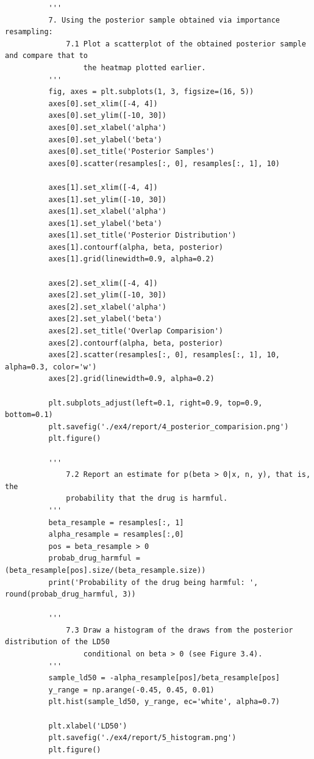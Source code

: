 \documentclass[11pt,a4paper,english]{article}
\begin{document}
\begin{appendices}
\begin{verbatim}
          '''
          7. Using the posterior sample obtained via importance resampling:
              7.1 Plot a scatterplot of the obtained posterior sample and compare that to
                  the heatmap plotted earlier.
          '''
          fig, axes = plt.subplots(1, 3, figsize=(16, 5))
          axes[0].set_xlim([-4, 4])
          axes[0].set_ylim([-10, 30])
          axes[0].set_xlabel('alpha')
          axes[0].set_ylabel('beta')
          axes[0].set_title('Posterior Samples')
          axes[0].scatter(resamples[:, 0], resamples[:, 1], 10)

          axes[1].set_xlim([-4, 4])
          axes[1].set_ylim([-10, 30])
          axes[1].set_xlabel('alpha')
          axes[1].set_ylabel('beta')
          axes[1].set_title('Posterior Distribution')
          axes[1].contourf(alpha, beta, posterior)
          axes[1].grid(linewidth=0.9, alpha=0.2)

          axes[2].set_xlim([-4, 4])
          axes[2].set_ylim([-10, 30])
          axes[2].set_xlabel('alpha')
          axes[2].set_ylabel('beta')
          axes[2].set_title('Overlap Comparision')
          axes[2].contourf(alpha, beta, posterior)
          axes[2].scatter(resamples[:, 0], resamples[:, 1], 10, alpha=0.3, color='w')
          axes[2].grid(linewidth=0.9, alpha=0.2)

          plt.subplots_adjust(left=0.1, right=0.9, top=0.9, bottom=0.1)
          plt.savefig('./ex4/report/4_posterior_comparision.png')
          plt.figure()

          '''
              7.2 Report an estimate for p(beta > 0|x, n, y), that is, the
              probability that the drug is harmful.
          '''
          beta_resample = resamples[:, 1]
          alpha_resample = resamples[:,0]
          pos = beta_resample > 0
          probab_drug_harmful = (beta_resample[pos].size/(beta_resample.size))
          print('Probability of the drug being harmful: ', round(probab_drug_harmful, 3))

          '''
              7.3 Draw a histogram of the draws from the posterior distribution of the LD50
                  conditional on beta > 0 (see Figure 3.4).
          '''
          sample_ld50 = -alpha_resample[pos]/beta_resample[pos]
          y_range = np.arange(-0.45, 0.45, 0.01)
          plt.hist(sample_ld50, y_range, ec='white', alpha=0.7)

          plt.xlabel('LD50')
          plt.savefig('./ex4/report/5_histogram.png')
          plt.figure()
        \end{verbatim}
      \end{appendices}
  
\end{document}
